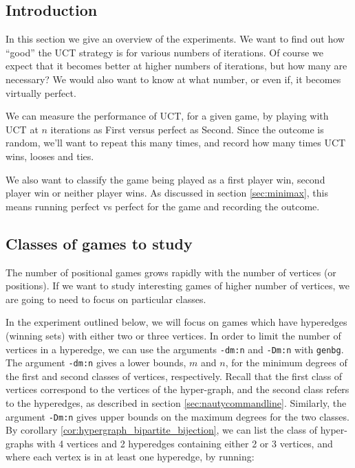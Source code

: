 \subsection{Introduction}

In this section we give an overview of the experiments.
We want to find out how ``good'' the UCT strategy is for various numbers of iterations.
Of course we expect that it becomes better at higher numbers of iterations, but how many are necessary?
We would also want to know at what number, or even if, it becomes virtually perfect.

We can measure the performance of UCT, for a given game, by playing with UCT at $n$ iterations as First versus perfect as Second.
Since the outcome is random, we'll want to repeat this many times, and record how many times UCT wins, looses and ties.

We also want to classify the game being played as a first player win, second player win or neither player wins.
As discussed in section \ref{sec:minimax}, this means running perfect vs perfect for the game and recording the outcome.


\subsection{Classes of games to study}

The number of positional games grows rapidly with the number of vertices (or positions).
If we want to study interesting games of higher number of vertices, we are going to need to focus on particular classes.

In the experiment outlined below, we will focus on games which have hyperedges (winning sets) with either two or three vertices.
In order to limit the number of vertices in a hyperedge, we can use the arguments \texttt{-dm:n} and \texttt{-Dm:n} with \texttt{genbg}.
The argument \texttt{-dm:n} gives a lower bounds, $m$ and $n$, for the minimum degrees of the first and second classes of vertices, respectively.
Recall that the first class of vertices correspond to the vertices of the hyper-graph, and the second class refers to the hyperedges, as described in section \ref{sec:nautycommandline}.
Similarly, the argument \texttt{-Dm:n} gives upper bounds on the maximum degrees for the two classes.
By corollary \ref{cor:hypergraph_bipartite_bijection}, we can list the class of hyper-graphs with 4 vertices and 2 hyperedges containing either 2 or 3 vertices, and where each vertex is in at least one hyperedge, by running:


